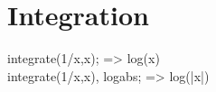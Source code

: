 \documentclass[../Maxima_Workbook.tex]{subfiles}
\begin{document}
	
\chapter{Integration}

integrate(1/x,x); => log(x) \\
integrate(1/x,x), logabs; => log(|x|)
\end{document}
